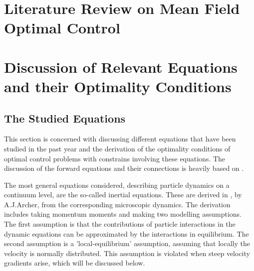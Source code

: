 \documentclass[11pt, a4paper]{article}
\theoremstyle{definition}
\begin{document}
\section{Literature Review on Mean Field Optimal Control}

\section{Discussion of Relevant Equations and their Optimality Conditions}
\subsection{The Studied Equations}
This section is concerned with discussing different equations that have been studied in the past year and the derivation of the optimality conditions of optimal control problems with constrains involving these equations. The discussion of the forward equations and their connections is heavily based on \cite{Archer1}.

The most general equations considered, describing particle dynamics on a continuum level, are the so-called inertial equations. These are derived in \cite{Archer1}, by A.J.Archer, from the corresponding microscopic dynamics. The derivation includes taking momentum moments and making two modelling assumptions. The first assumption is that the contributions of particle interactions in the dynamic equations can be approximated by the interactions in equilibrium. The second assumption is a 'local-equilibrium' assumption, assuming that locally the velocity is normally distributed. This assumption is violated when steep velocity gradients arise, which will be discussed below.
\end{document}
